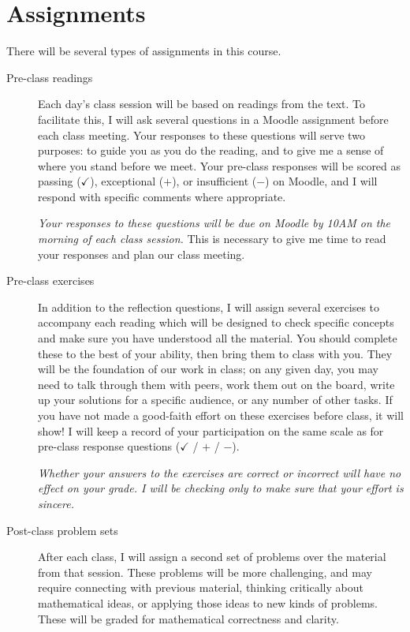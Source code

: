 \documentclass[11pt,article]{memoir}
\begin{document}
\section*{Assignments}
There will be several types of assignments in this course.
\begin{description}
\item[Pre-class readings]
  Each day's class session will be based on readings from the text.
  To facilitate this, I will ask several questions in a Moodle assignment before each class meeting.
  Your responses to these questions will serve two purposes: to guide you as you do the reading, and to give me a sense of where you stand before we meet.
  Your pre-class responses will be scored as passing ($\checkmark$), exceptional ($+$), or insufficient ($-$) on Moodle, and I will respond with specific comments where appropriate.

  \emph{Your responses to these questions will be due on Moodle by 10AM on the morning of each class session.}
  This is necessary to give me time to read your responses and plan our class meeting.

\item[Pre-class exercises]
  In addition to the reflection questions, I will assign several exercises to accompany each reading which will be designed to check specific concepts and make sure you have understood all the material.
  You should complete these to the best of your ability, then bring them to class with you.
  They will be the foundation of our work in class; on any given day, you may need to talk through them with peers, work them out on the board, write up your solutions for a specific audience, or any number of other tasks.
  If you have not made a good-faith effort on these exercises before class, it will show!  
  I will keep a record of your participation on the same scale as for pre-class response questions ($\checkmark$ / $+$ / $-$).

  \emph{Whether your answers to the exercises are correct or incorrect will have no effect on your grade.
    I will be checking only to make sure that your effort is sincere.}

\item[Post-class problem sets]
  After each class, I will assign a second set of problems over the material from that session.
  These problems will be more challenging, and may require connecting with previous material, thinking critically about mathematical ideas, or applying those ideas to new kinds of problems.
  These will be graded for mathematical correctness and clarity.


\end{description}
\end{document}

